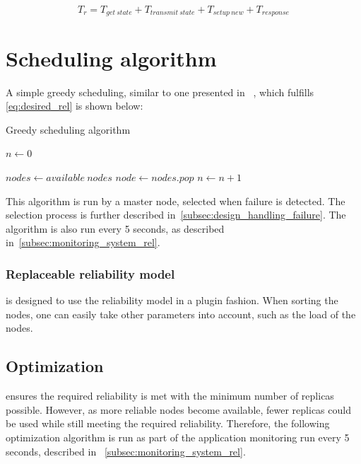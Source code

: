 \documentclass{cslthse-msc}
\begin{document}
\begin{equation} \label{eq:replication_time}
T_{r} = T_{get\ state} + T_{transmit\ state} + T_{setup\ new} + T_{response}
\end{equation} 

\section{Scheduling algorithm} \label{subsec:design_sched_alg}
A simple greedy scheduling, similar to one presented in ~\cite{effTaskReplMobGrid}, which fulfills \cref{eq:desired_rel} is shown below:


\begin{algorithm} 
	\caption{Greedy scheduling algorithm} \label{alg:scheduling}
	\begin{algorithmic}[1]
	\State $n\gets 0$
	
	\State $nodes\gets available\ nodes$
		\State $node\gets nodes.pop$
		\State
		\State $n\gets n + 1$
	\EndWhile
	\end{algorithmic}
\end{algorithm}

This algorithm is run by a master node, selected when failure is detected. The selection process is further described in~\cref{subsec:design_handling_failure}. The algorithm is also run every 5 seconds, as described in~\cref{subsec:monitoring_system_rel}.

\subsubsection{Replaceable reliability model}
 is designed to use the reliability model in a plugin fashion. When sorting the nodes, one can easily take other parameters into account, such as the load of the nodes.

\subsection{Optimization} \label{subsec:design_optimization}
 ensures the required reliability is met with the minimum number of replicas possible. However, as more reliable nodes become available, fewer replicas could be used while still meeting the required reliability. Therefore, the following optimization algorithm is run as part of the application monitoring run every 5 seconds, described in ~\cref{subsec:monitoring_system_rel}.
\end{document}
